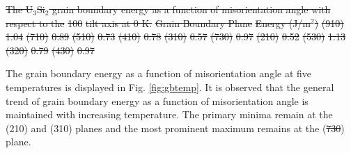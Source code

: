 \documentclass[review]{elsarticle}
\providecommand{\DIFaddtex}[1]{{\protect\color{blue}\uwave{#1}}} %
\providecommand{\DIFdeltex}[1]{{\protect\color{red}\sout{#1}}}                      %
\providecommand{\DIFaddbegin}{} %
\providecommand{\DIFaddend}{} %
\providecommand{\DIFdelbegin}{} %
\providecommand{\DIFdelend}{} %
\providecommand{\DIFdelFL}[1]{\DIFdel{#1}} %
\providecommand{\DIFadd}[1]{\texorpdfstring{\DIFaddtex{#1}}{#1}} %
\providecommand{\DIFdel}[1]{\texorpdfstring{\DIFdeltex{#1}}{}} %
\newcommand{\DIFscaledelfig}{0.5}
\newlength{\DIFdelgraphicswidth} %
\newlength{\DIFdelgraphicsheight} %
\newcommand{\DIFaddincludegraphics}[2][]{{\color{blue}\fbox{\DIFOincludegraphics[#1]{#2}}}} %
\newcommand{\DIFdelincludegraphics}[2][]{%
\sbox{\DIFdelgraphicsbox}{\DIFOincludegraphics[#1]{#2}}%
\settoboxwidth{\DIFdelgraphicswidth}{\DIFdelgraphicsbox} %
\settoboxtotalheight{\DIFdelgraphicsheight}{\DIFdelgraphicsbox} %
\scalebox{\DIFscaledelfig}{%
\parbox[b]{\DIFdelgraphicswidth}{\usebox{\DIFdelgraphicsbox}\\[-\baselineskip] \rule{\DIFdelgraphicswidth}{0em}}\llap{\resizebox{\DIFdelgraphicswidth}{\DIFdelgraphicsheight}{%
\setlength{\unitlength}{\DIFdelgraphicswidth}%
\begin{picture}(1,1)%
\thicklines\linethickness{2pt} %
{\color[rgb]{1,0,0}\put(0,0){\framebox(1,1){}}}%
{\color[rgb]{1,0,0}\put(0,0){\line( 1,1){1}}}%
{\color[rgb]{1,0,0}\put(0,1){\line(1,-1){1}}}%
\end{picture}%
}\hspace*{3pt}}} %
} %
\DeclareRobustCommand{\DIFaddbegin}{\DIFOaddbegin \let\includegraphics\DIFaddincludegraphics} %
\DeclareRobustCommand{\DIFaddend}{\DIFOaddend \let\includegraphics\DIFOincludegraphics} %
\DeclareRobustCommand{\DIFdelbegin}{\DIFOdelbegin \let\includegraphics\DIFdelincludegraphics} %
\DeclareRobustCommand{\DIFdelend}{\DIFOaddend \let\includegraphics\DIFOincludegraphics} %
\begin{document}
\DIFdelbegin %
{%
\DIFdelFL{The U$_{3}$Si$_{2}$ grain boundary energy as a function of misorientation angle with respect to the }%
\DIFdelFL{100}%
\DIFdelFL{tilt axis at 0 K.}} %
\DIFdelFL{Grain Boundary Plane }%
\DIFdelFL{Energy (J/m$^{2}$) }%
\DIFdelFL{(910) }%
\DIFdelFL{1.04 }%
\DIFdelFL{(710) }%
\DIFdelFL{0.89 }%
\DIFdelFL{(510) }%
\DIFdelFL{0.73 }%
\DIFdelFL{(410) }%
\DIFdelFL{0.78 }%
\DIFdelFL{(310) }%
\DIFdelFL{0.57 }%
\DIFdelFL{(730) }%
\DIFdelFL{0.97 }%
\DIFdelFL{(210) }%
\DIFdelFL{0.52 }%
\DIFdelFL{(530) }%
\DIFdelFL{1.13 }%
\DIFdelFL{(320) }%
\DIFdelFL{0.79 }%
\DIFdelFL{(430) }%
\DIFdelFL{0.97 }%

\DIFdelend \FloatBarrier

The grain boundary energy as a function of misorientation angle at five temperatures is displayed in Fig. \ref{fig:gbtemp}. It is observed that the general trend of grain boundary energy as a function of misorientation angle is maintained with increasing temperature. The primary minima remain at the (210) and (310) planes and the most prominent maximum remains at the (\DIFdelbegin \DIFdel{730}\DIFdelend \DIFaddbegin \DIFadd{530}\DIFaddend ) plane. 
\end{document}
